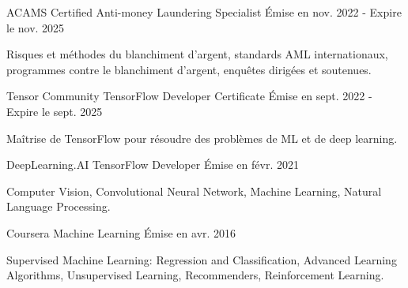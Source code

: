 
\begin{cventries}

  \cventry
    {ACAMS} %
    {Certified Anti-money Laundering Specialist} %
    {} %
    {Émise en nov. 2022 - Expire le nov. 2025} %
    {
      \begin{cvitems} %
        \item {Risques et méthodes du blanchiment d’argent, standards AML internationaux, programmes contre le blanchiment d’argent, enquêtes dirigées et soutenues.} 
      \end{cvitems}
    }


  \cventry
    {Tensor Community} %
    {TensorFlow Developer Certificate} %
    {} %
    {Émise en sept. 2022 - Expire le sept. 2025} %
    {
      \begin{cvitems} %
        \item {Maîtrise de TensorFlow pour résoudre des problèmes de ML et de deep learning.}
      \end{cvitems}
    }


  \cventry
    {DeepLearning.AI} %
    {TensorFlow Developer} %
    {} %
    {Émise en févr. 2021} %
    {
      \begin{cvitems} %
        \item {Computer Vision, Convolutional Neural Network, Machine Learning, Natural Language Processing.}
      \end{cvitems}
    }


  \cventry
    {Coursera} %
    {Machine Learning} %
    {} %
    {Émise en avr. 2016} %
    {
      \begin{cvitems} %
        \item {Supervised Machine Learning: Regression and Classification, Advanced Learning Algorithms, Unsupervised Learning, Recommenders, Reinforcement Learning.}
      \end{cvitems}
    }  

\end{cventries}
